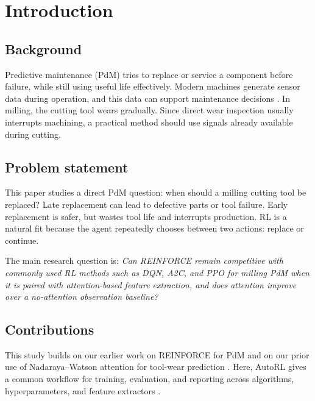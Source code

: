 \documentclass[sn-basic]{sn-jnl}%
\begin{document}

\maketitle

\section{Introduction}
\subsection{Background}
Predictive maintenance (PdM) tries to replace or service a component before failure, while still using useful life effectively. Modern machines generate sensor data during operation, and this data can support maintenance decisions \cite{Zonta2020, Compare2020}. In milling, the cutting tool wears gradually. Since direct wear inspection usually interrupts machining, a practical method should use signals already available during cutting.

\subsection{Problem statement}
This paper studies a direct PdM question: when should a milling cutting tool be replaced? Late replacement can lead to defective parts or tool failure. Early replacement is safer, but wastes tool life and interrupts production. RL is a natural fit because the agent repeatedly chooses between two actions: replace or continue.

The main research question is: \emph{Can \textsc{REINFORCE} remain competitive with commonly used RL methods such as \textsc{DQN}, \textsc{A2C}, and \textsc{PPO} for milling PdM when it is paired with attention-based feature extraction, and does attention improve over a no-attention observation baseline?}

\subsection{Contributions}

This study builds on our earlier work on \textsc{REINFORCE} for PdM \cite{Siraskar2025} and on our prior use of Nadaraya--Watson attention for tool-wear prediction \cite{Siraskar2024}. Here, AutoRL gives a common workflow for training, evaluation, and reporting across algorithms, hyperparameters, and feature extractors \cite{Schwartz2020, Strubell2019, Faust2019, Mussi2022}.
\end{document}

